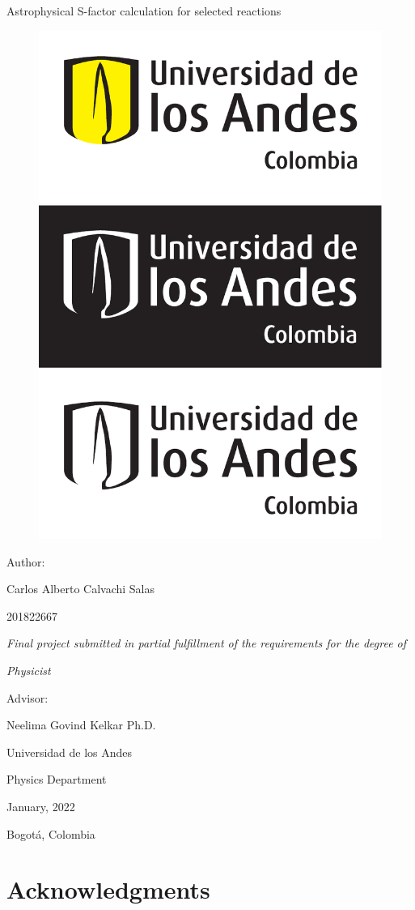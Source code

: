 \documentclass[openany]{book}
\begin{document}
		\begin{titlepage}
		\centering
		
		{\Huge Astrophysical S-factor calculation for selected reactions  \par}
		
		\begin{figure}[H]
			\centering
			\includegraphics[width=0.5\linewidth]{logo.pdf}
			\label{fig:logo}
		\end{figure}
		{\Large Author:  \par}
		{\Large Carlos Alberto Calvachi Salas \par}
		{\Large 201822667 \par}
		\vfill
		{\Large\textit{Final project submitted in partial fulfillment of the requirements for the degree of} \par}
		\vfill
		{\Large\textit{Physicist} \par}
		\vfill
		{\Large Advisor:  \par}
		{\Large Neelima Govind Kelkar Ph.D. \par}
		\vfill
		{\Large Universidad de los Andes  \par}
		{\Large Physics Department  \par}
		{\Large January, 2022  \par}
		{\Large Bogotá, Colombia \par}
	\end{titlepage}


\chapter*{Acknowledgments}
\end{document}
